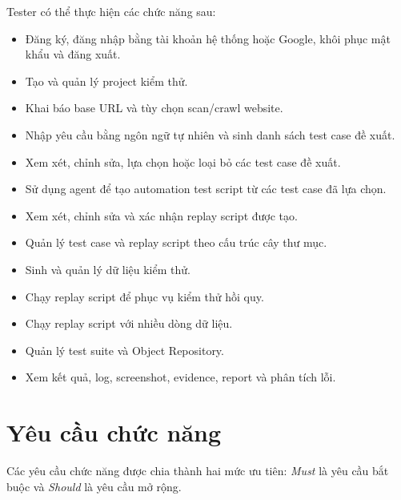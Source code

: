 Tester có thể thực hiện các chức năng sau:

\begin{itemize}
    \item Đăng ký, đăng nhập bằng tài khoản hệ thống hoặc Google, khôi phục mật khẩu và đăng xuất.
    
    \item Tạo và quản lý project kiểm thử.
    
    \item Khai báo base URL và tùy chọn scan/crawl website.
    
    \item Nhập yêu cầu bằng ngôn ngữ tự nhiên và sinh danh sách test case đề xuất.
    
    \item Xem xét, chỉnh sửa, lựa chọn hoặc loại bỏ các test case đề xuất.
    
    \item Sử dụng agent để tạo automation test script từ các test case đã lựa chọn.
    
    \item Xem xét, chỉnh sửa và xác nhận replay script được tạo.
    
    \item Quản lý test case và replay script theo cấu trúc cây thư mục.
    
    \item Sinh và quản lý dữ liệu kiểm thử.
    
    \item Chạy replay script để phục vụ kiểm thử hồi quy.
    
    \item Chạy replay script với nhiều dòng dữ liệu.
    
    \item Quản lý test suite và Object Repository.
    
    \item Xem kết quả, log, screenshot, evidence, report và phân tích lỗi.
\end{itemize}

\section{Yêu cầu chức năng}

Các yêu cầu chức năng được chia thành hai mức ưu tiên: \textit{Must} là yêu cầu bắt buộc và \textit{Should} là yêu cầu mở rộng.

